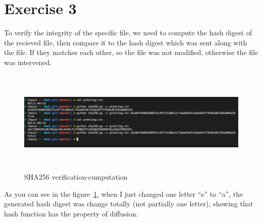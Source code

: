 \documentclass{article}
\begin{document}
\section*{Exercise 3}
%
To verify the integrity of the specific file, we need to compute the hash digest of the
recieved file, then compare it to the hash digest which was sent along with the file.
If they matches each other, so the file was not modified, otherwise the file was intervened.

\begin{figure}
    \centering
    \includegraphics[width=140mm, height=50mm]{sha256.png}
    \caption{SHA256 verification-cumputation}
    \label{fig:sha256}
\end{figure}

As you can see in the figure~\ref{fig:sha256}, when I just changed one letter ``e'' to ``a'', the
generated hash digest was change totally (not partially one letter), showing that hash function
has the property of diffusion.
\end{document}

